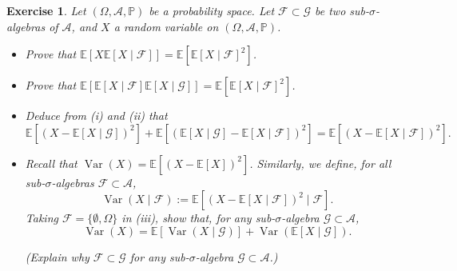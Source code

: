 \documentclass{article}
\newtheorem{exercise}[theorem]{Exercise}
\begin{document}
\begin{exercise}
Let $(\Omega, \mathcal{A}, \mathbb{P})$ be a probability space. Let $\mathcal{F} \subset \mathcal{G}$ be two sub-$\sigma$-algebras of $\mathcal{A}$, and $X$ a random variable on $(\Omega, \mathcal{A}, \mathbb{P})$.

\begin{itemize}
  \item[(a)] Prove that $\mathbb{E}[X \mathbb{E}[X \mid \mathcal{F}]] = \mathbb{E}[\mathbb{E}[X \mid \mathcal{F}]^2]$.
  
  \item[(b)] Prove that $\mathbb{E}[\mathbb{E}[X \mid \mathcal{F}] \mathbb{E}[X \mid \mathcal{G}]] = \mathbb{E}[\mathbb{E}[X \mid \mathcal{F}]^2]$.
  
  \item[(c)] Deduce from (i) and (ii) that
  \[
  \mathbb{E}[(X - \mathbb{E}[X \mid \mathcal{G}])^2] + \mathbb{E}[(\mathbb{E}[X \mid \mathcal{G}] - \mathbb{E}[X \mid \mathcal{F}])^2] = \mathbb{E}[(X - \mathbb{E}[X \mid \mathcal{F}])^2].
  \]
  
  \item[(d)] Recall that $\operatorname{Var}(X) = \mathbb{E}[(X - \mathbb{E}[X])^2]$. Similarly, we define, for all sub-$\sigma$-algebras $\mathcal{F} \subset \mathcal{A}$,
  \[
  \operatorname{Var}(X \mid \mathcal{F}) := \mathbb{E}[(X - \mathbb{E}[X \mid \mathcal{F}])^2 \mid \mathcal{F}].
  \]
  Taking $\mathcal{F} = \{\emptyset, \Omega\}$ in (iii), show that, for any sub-$\sigma$-algebra $\mathcal{G} \subset \mathcal{A}$,
  \[
  \operatorname{Var}(X) = \mathbb{E}[\operatorname{Var}(X \mid \mathcal{G})] + \operatorname{Var}(\mathbb{E}[X \mid \mathcal{G}]).
  \tag{2}
  \]
  
  (Explain why $\mathcal{F} \subset \mathcal{G}$ for any sub-$\sigma$-algebra $\mathcal{G} \subset \mathcal{A}$.)
\end{itemize}
\end{exercise}
\end{document}
